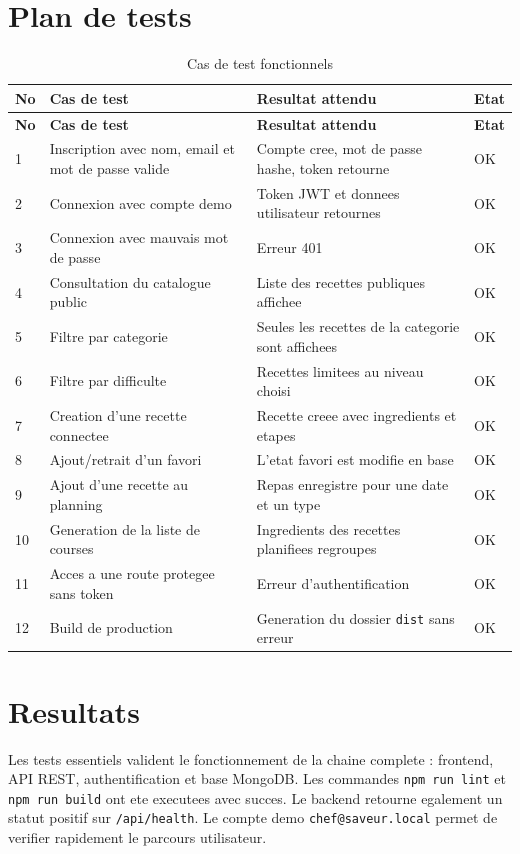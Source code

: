 \documentclass[12pt,a4paper]{report}
\begin{document}
\section{Plan de tests}

\begin{longtable}{p{1cm}p{5cm}p{5cm}p{2cm}}
  \caption{Cas de test fonctionnels}\\
  \toprule
  \textbf{No} & \textbf{Cas de test} & \textbf{Resultat attendu} & \textbf{Etat}\\
  \midrule
  \endfirsthead
  \toprule
  \textbf{No} & \textbf{Cas de test} & \textbf{Resultat attendu} & \textbf{Etat}\\
  \midrule
  \endhead
  1 & Inscription avec nom, email et mot de passe valide & Compte cree, mot de passe hashe, token retourne & OK\\
  2 & Connexion avec compte demo & Token JWT et donnees utilisateur retournes & OK\\
  3 & Connexion avec mauvais mot de passe & Erreur 401 & OK\\
  4 & Consultation du catalogue public & Liste des recettes publiques affichee & OK\\
  5 & Filtre par categorie & Seules les recettes de la categorie sont affichees & OK\\
  6 & Filtre par difficulte & Recettes limitees au niveau choisi & OK\\
  7 & Creation d'une recette connectee & Recette creee avec ingredients et etapes & OK\\
  8 & Ajout/retrait d'un favori & L'etat favori est modifie en base & OK\\
  9 & Ajout d'une recette au planning & Repas enregistre pour une date et un type & OK\\
  10 & Generation de la liste de courses & Ingredients des recettes planifiees regroupes & OK\\
  11 & Acces a une route protegee sans token & Erreur d'authentification & OK\\
  12 & Build de production & Generation du dossier \texttt{dist} sans erreur & OK\\
  \bottomrule
\end{longtable}

\section{Resultats}

Les tests essentiels valident le fonctionnement de la chaine complete : frontend, API REST, authentification et base MongoDB. Les commandes \texttt{npm run lint} et \texttt{npm run build} ont ete executees avec succes. Le backend retourne egalement un statut positif sur \texttt{/api/health}. Le compte demo \texttt{chef@saveur.local} permet de verifier rapidement le parcours utilisateur.
\end{document}
